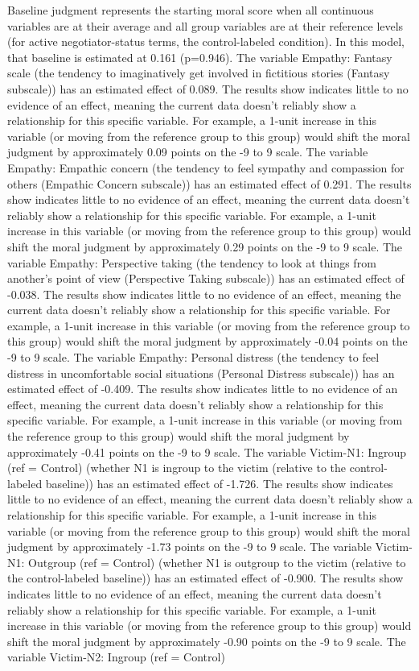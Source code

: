 \documentclass[11pt]{article}
\begin{document}
Baseline judgment represents the starting moral score when all continuous variables are at their average and all group variables are at their reference levels (for active negotiator-status terms, the control-labeled condition). In this model, that baseline is estimated at 0.161 (p=0.946). The variable Empathy: Fantasy scale (the tendency to imaginatively get involved in fictitious stories (Fantasy subscale)) has an estimated effect of 0.089. The results show indicates little to no evidence of an effect, meaning the current data doesn't reliably show a relationship for this specific variable. For example, a 1-unit increase in this variable (or moving from the reference group to this group) would shift the moral judgment by approximately 0.09 points on the -9 to 9 scale. The variable Empathy: Empathic concern (the tendency to feel sympathy and compassion for others (Empathic Concern subscale)) has an estimated effect of 0.291. The results show indicates little to no evidence of an effect, meaning the current data doesn't reliably show a relationship for this specific variable. For example, a 1-unit increase in this variable (or moving from the reference group to this group) would shift the moral judgment by approximately 0.29 points on the -9 to 9 scale. The variable Empathy: Perspective taking (the tendency to look at things from another's point of view (Perspective Taking subscale)) has an estimated effect of -0.038. The results show indicates little to no evidence of an effect, meaning the current data doesn't reliably show a relationship for this specific variable. For example, a 1-unit increase in this variable (or moving from the reference group to this group) would shift the moral judgment by approximately -0.04 points on the -9 to 9 scale. The variable Empathy: Personal distress (the tendency to feel distress in uncomfortable social situations (Personal Distress subscale)) has an estimated effect of -0.409. The results show indicates little to no evidence of an effect, meaning the current data doesn't reliably show a relationship for this specific variable. For example, a 1-unit increase in this variable (or moving from the reference group to this group) would shift the moral judgment by approximately -0.41 points on the -9 to 9 scale. The variable Victim-N1: Ingroup (ref = Control) (whether N1 is ingroup to the victim (relative to the control-labeled baseline)) has an estimated effect of -1.726. The results show indicates little to no evidence of an effect, meaning the current data doesn't reliably show a relationship for this specific variable. For example, a 1-unit increase in this variable (or moving from the reference group to this group) would shift the moral judgment by approximately -1.73 points on the -9 to 9 scale. The variable Victim-N1: Outgroup (ref = Control) (whether N1 is outgroup to the victim (relative to the control-labeled baseline)) has an estimated effect of -0.900. The results show indicates little to no evidence of an effect, meaning the current data doesn't reliably show a relationship for this specific variable. For example, a 1-unit increase in this variable (or moving from the reference group to this group) would shift the moral judgment by approximately -0.90 points on the -9 to 9 scale. The variable Victim-N2: Ingroup (ref = Control) 
\end{document}
